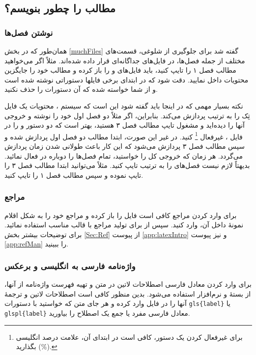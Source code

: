\subsection[مطالب پایان‌نامه را چطور بنویسم؟]
{مطالب \پ را چطور بنویسم؟}
\subsubsection{نوشتن فصل‌ها}
همان‌طور که در بخش \ref{muchFiles} گفته شد برای جلوگیری از شلوغی، قسمت‌های مختلف \پ از جمله فصل‌ها، در فایل‌های جداگانه‌ای قرار داده شده‌اند. 
مثلاً اگر می‌خواهید مطالب فصل ۱ را تایپ کنید، باید فایل‌های 
و
را باز کرده و مطالب خود را جایگزین محتویات داخل 
نمایید. دقت شود که در ابتدای برخی فایلها دستوراتی نوشته شده است و از شما خواسته شده که آن دستورات را حذف نکنید.


نکته بسیار مهمی که در اینجا باید گفته شود این است که سیستم \lr{\TeX}، محتویات یک فایل تِک را به ترتیب پردازش می‌کند.  بنابراین، اگر مثلاً  دو فصل اول خود را نوشته و خروجی آنها را دیده‌اید و مشغول تایپ مطالب فصل ۳ هستید، بهتر است
که دو دستور 
\verb!!
و
\verb!!
را در فایل 
،
غیرفعال%
\footnote{
برای غیرفعال کردن یک دستور، کافی است در ابتدای آن، علامت درصد انگلیسی (\%) بگذارید.
}
 کنید. در غیر این صورت، ابتدا مطالب دو فصل اول پردازش شده و سپس مطالب فصل ۳ پردازش می‌شود که این کار باعث طولانی شدن زمان پردازش می‌گردد. هر زمان که خروجی کل \پ را خواستید، تمام فصل‌ها را دوباره در
فعال نمائید.
بدیهتاً لازم نیست فصل‌های \پ را به ترتیب تایپ کنید. مثلاً می‌توانید ابتدا مطالب فصل ۳ را تایپ نموده و سپس مطالب فصل ۱ را تایپ کنید. 
\subsubsection{مراجع}
برای وارد کردن مراجع \پ کافی است فایل 
را باز کرده و مراجع خود را به شکل اقلام نمونهٔ داخل آن، وارد کنید.  سپس از  برای تولید مراجع با قالب مناسب استفاده نمائید. برای توضیحات بیشتر بخش \ref{Sec:Ref} از پیوست \ref{app:latexIntro} و نیز پیوست \ref{app:refMan} را ببینید.

\subsubsection{واژه‌نامه فارسی به انگلیسی و برعکس}
برای وارد کردن معادل فارسی اصطلاحات لاتین در متن و تهیه فهرست واژه‌نامه از آنها، از بستهٔ
و نرم‌افزار
استفاده می‌شود. بدین منظور کافی است اصطلاحات لاتین و ترجمهٔ آنها را در فایل
وارد کرده و هر جای متن که خواستید با دستورات
\verb|gls{label}|
یا \verb|glspl{label}|
معادل فارسی مفرد یا جمع یک اصطلاح را بیاورید.

